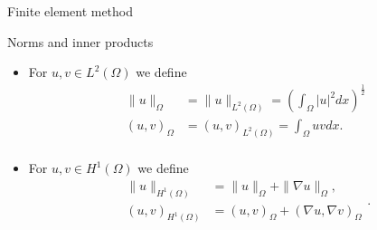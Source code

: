 \begin{frame}{Finite element method}

        \begin{block}{Norms and inner products}
            \begin{itemize}
                \item For $u ,v \in L^2( \Omega )  $ we define  \[
                        \begin{split}
\| u \|_{  \Omega   }^{  } & = \| u \|_{ L^{2}\left( \Omega  \right)  }^{  }   = \left( \int_{\Omega }^{} \left\lvert u \right\rvert ^{2} dx  \right) ^{\frac{1}{2}} \\
\left( u,v \right) _{\Omega } & = \left( u,v \right) _{L^2\left( \Omega  \right) } = \int_{\Omega }^{} u  v dx. \\
                        \end{split}
                    \]
                \item  For $u,v \in H^1( \Omega ) $ we define \[
                    \begin{split}
\| u \|_{ H^{1}\left( \Omega  \right)  }^{  }  & =  \| u \|_{ \Omega } +\| \nabla u \|_{ \Omega }    , \\
\left( u,v \right) _{H^{1}( \Omega )  } & = \left( u,v \right) _{\Omega  } + \left( \nabla u, \nabla v \right) _{\Omega  }
                    \end{split} .
                    \]
            \end{itemize}

        \end{block}

\end{frame}


